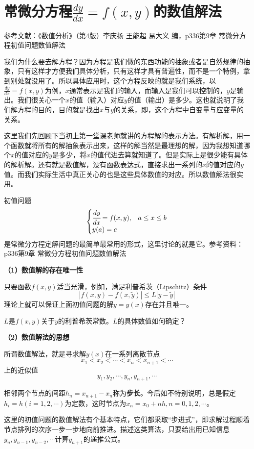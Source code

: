 \chapter{常微分方程$\frac{dy}{dx}=f(x,y)$的数值解法}
参考文献：《数值分析》（第4版）李庆扬 王能超 易大义 编，p336第9章 常微分方程初值问题数值解法

我们为什么要去解方程？因为方程是我们做的东西功能的抽象或者是自然规律的抽象，只有这样才方便我们具体分析，只有这样才具有普遍性，而不是一个特例，拿到别处就没用了。所以具体应用时，这个方程反映的就是我们系统，以$\frac{dy}{dx}=f(x,y)$为例，$x$通常表示是我们的输入，而输入是我们可以控制的，$y$是输出。我们很关心一个$x$的值（输入）对应$y$的值（输出）是多少。这也就说明了我们解方程的目的，目的就是找出$x$与$y$的关系，即，这个方程中自变量与应变量的关系。

这里我们先回顾下当初上第一堂课老师就讲的方程解的表示方法。有解析解，用一个函数就将所有的解抽象表示出来，这样的解当然是最理想的解，因为我想知道哪个$x$的值对应的$y$是多少，将$x$的值代进去算就知道了。但是实际上是很少能有具体的解析解。还有就是数值解，没有函数表达式，直接求出一系列的$x$的值对应的$y$值。而我们实际生活中真正关心的也是这些具体数值的对应。所以数值解法很实用。

初值问题
$$\begin{cases}\cfrac{dy}{dx}=f(x,y),&a\le x\le b\\ y(a)=c &\end{cases}$$
是常微分方程定解问题的最简单最常用的形式，这里讨论的就是它。参考资料：\cite{数值分析}p336第9章 常微分方程初值问题数值解法

\textbf{（1）数值解的存在唯一性}

只要函数$f(x,y)$适当光滑，例如，满足利普希茨（Lipschitz）条件
$$|f(x,y)-f(x,\tilde{y})|\le L|y-\tilde{y}|$$
理论上就可以保证上面初值问题的解$y=y(x)$存在并且唯一。

$L$是$f(x,y)$关于$y$的利普希茨常数。$L$的具体数值如何确定？

\textbf{（2）数值解法的思想}

所谓数值解法，就是寻求解$y(x)$在一系列离散节点
$$x_1<x_2<\cdots <x_n <x_{n+1}<\cdots$$
上的近似值
$$y_1,y_2,\cdots,y_n,y_{n+1},\cdots$$

相邻两个节点的间距$h_n=x_{n+1}-x_n$称为\textbf{步长}。今后如不特别说明，总是假定$h_i=h(i=1,2,\cdots)$为定数，这时节点为$x_n=x_0+nh,n=0,1,2,\cdots$。

这里的初值问题的数值解法有个基本特点，它们都采取“步进式”，即求解过程顺着节点排列的次序一步一步地向前推进。描述这类算法，只要给出用已知信息$y_n,y_{n-1},y_{n-2},\cdots$计算$y_{n+1}$的递推公式。

